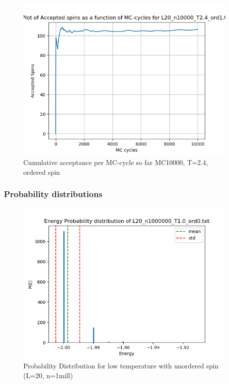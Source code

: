 \documentclass{article}
\begin{document}
  \begin{figure}[ht]
      \centering
      \includegraphics[width = 11cm]{img/accept_L20_n10000_T24_ord1.png}
      \caption{Cumulative acceptance per MC-cycle so far MC10000, T=2.4, ordered spin}
      \label{fig:accept_L20_n10000_T2.4_ord1}
    \end{figure}

  \subsubsection{Probability distributions}

  \begin{figure}[ht]
      \centering
      \includegraphics[width = 11cm]{img/energyhistogram_L20_n1000000_T10_ord0.png}
      \caption{Probability Distribution for low temperature with unordered spin (L=20, n=1mill)}
      \label{fig:prob-lowT-ord0}
    \end{figure}
\end{document}
